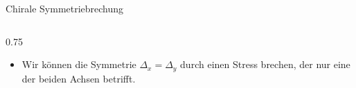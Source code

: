 \begin{frame}{Chirale Symmetriebrechung}
    \begin{columns}
        \begin{column}{0.75\linewidth}
            \begin{itemize}
                \item Wir können die Symmetrie $\Delta_x = \Delta_y$ durch einen Stress brechen, der nur eine der beiden Achsen betrifft.
            \end{itemize}
        \end{column}
    \end{columns}
\end{frame}


